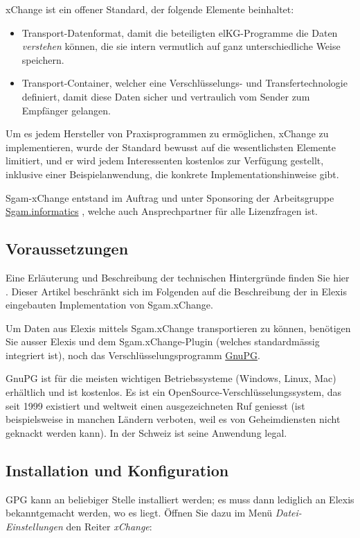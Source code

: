 xChange ist ein offener Standard, der folgende Elemente beinhaltet:
\begin{itemize}
 \item Transport-Datenformat, damit die beteiligten elKG-Programme die Daten \textit{verstehen} können, die sie intern vermutlich auf ganz unterschiedliche Weise speichern.
\item Transport-Container, welcher eine Verschlüsselungs- und Transfertechnologie definiert, damit diese Daten sicher und vertraulich vom Sender zum Empfänger gelangen.
\end{itemize}
Um es jedem Hersteller von Praxisprogrammen zu ermöglichen, xChange zu implementieren, wurde der Standard bewusst auf die wesentlichsten Elemente limitiert, und er wird jedem Interessenten kostenlos zur Verfügung gestellt, inklusive einer Beispielanwendung, die konkrete Implementationshinweise gibt.

Sgam-xChange entstand im Auftrag und unter Sponsoring der Arbeitsgruppe \href{http://www.sgam.ch/informatics}{Sgam.informatics} , welche auch Ansprechpartner für alle Lizenzfragen ist.

\subsection{Voraussetzungen}


Eine Erläuterung und Beschreibung der technischen Hintergründe finden Sie hier .
 Dieser Artikel beschränkt sich im Folgenden auf die Beschreibung der in Elexis eingebauten Implementation von Sgam.xChange.

Um Daten aus Elexis mittels Sgam.xChange transportieren zu können, benötigen Sie ausser Elexis und dem Sgam.xChange-Plugin (welches standardmässig integriert ist), noch das Verschlüsselungsprogramm \href{http://www.gnupg.org}{GnuPG}.

 GnuPG ist für die meisten wichtigen Betriebssysteme (Windows, Linux, Mac) erhältlich und ist kostenlos. Es ist ein OpenSource-Verschlüsselungssystem, das seit 1999 existiert und weltweit einen ausgezeichneten Ruf geniesst (ist beispielsweise in manchen Ländern verboten, weil es von Geheimdiensten nicht geknackt werden kann). In der Schweiz ist seine Anwendung legal.

\subsection{Installation und Konfiguration}

GPG kann an beliebiger Stelle installiert werden; es muss dann lediglich an Elexis bekanntgemacht werden, wo es liegt. Öffnen Sie dazu im Menü \textit{Datei-Einstellungen} den Reiter \textit{xChange}:

